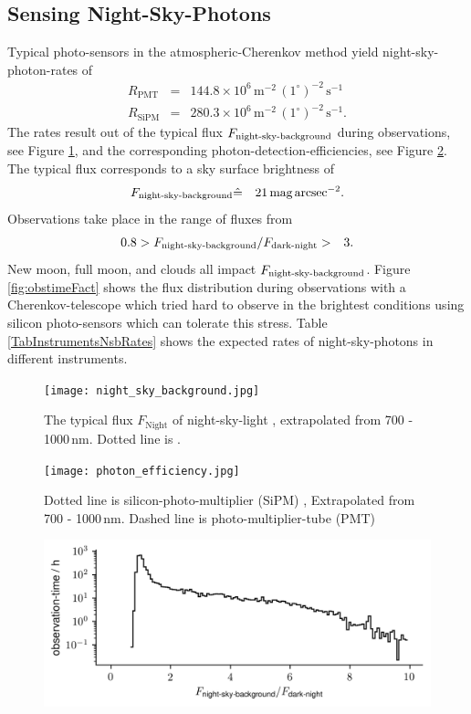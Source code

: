 \documentclass{article}%
\begin{document}
\begin{multicols}{2}
\section*{Sensing Night-Sky-Photons}%
\label{sec:nsb}%
%
Typical photo-sensors in the atmospheric-Cherenkov method yield night-sky-photon-rates of
\begin{eqnarray*}
R_\text{PMT} &=& 144.8\times10^6\,\text{m}^{-2}\,(1^\circ)^{-2}\,\text{s}^{-1}\\
R_\text{SiPM} &=& 280.3\times10^6\,\text{m}^{-2}\,(1^\circ)^{-2}\,\text{s}^{-1}.
\end{eqnarray*}
%
The rates result out of the typical flux $F_\text{night-sky-background}{}$ during observations, see Figure \ref{fig:nsb}, and the corresponding photon-detection-efficiencies, see Figure \ref{fig:pde}.
%
The typical flux  corresponds to a sky surface brightness of
%
\begin{eqnarray*}
F_\text{night-sky-background}{} &\hat{=}& 21\,\text{mag}\,\text{arcsec}^{-2}.
\end{eqnarray*}
%
Observations take place in the range of fluxes from
\begin{eqnarray*}
0.8 &> F_\text{night-sky-background}{} / F_\text{dark-night}{} >& 3.
\end{eqnarray*}
%
New moon, full moon, and clouds all impact $F_\text{night-sky-background}{}$.
%
Figure \ref{fig:obstimeFact} shows the flux distribution during observations with a Cherenkov-telescope which tried hard to observe in the brightest conditions using silicon photo-sensors which can tolerate this stress.
%
Table \ref{TabInstrumentsNsbRates} shows the expected rates of night-sky-photons in different instruments.
%
\begin{figure}[H]%
\centering%
\texttt{[image: night\_sky\_background.jpg]}%
\caption{
The typical flux $F_\text{Night}$ of night-sky-light \cite{benn1987night},
extrapolated from 700 - 1000\,nm. Dotted line is \cite{preuss2002study}.
}%
\label{fig:nsb}
\end{figure}
%
\begin{figure}[H]%
\centering%
\texttt{[image: photon\_efficiency.jpg]}%
\caption{
Dotted line is silicon-photo-multiplier (SiPM) \cite{hamamatsu2009mppc},
Extrapolated from 700 - 1000\,nm.
Dashed line is photo-multiplier-tube (PMT) \cite{toyama2013novel}
}%
\label{fig:pde}
\end{figure}
%
\begin{figure}[H]%
\centering%
\includegraphics[width=1.0\linewidth]{observation_time_histogram.png}%

\end{figure}
\end{multicols}
\end{document}
